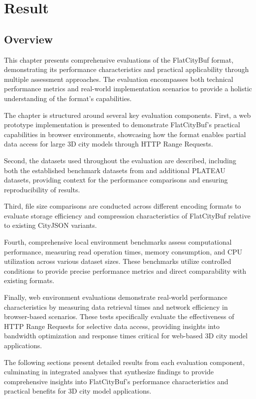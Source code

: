 \chapter{Result}
\label{chp:result}
\section{Overview}
\label{result:overview}
This chapter presents comprehensive evaluations of the FlatCityBuf format, demonstrating its performance characteristics and practical applicability through multiple assessment approaches. The evaluation encompasses both technical performance metrics and real-world implementation scenarios to provide a holistic understanding of the format's capabilities.

The chapter is structured around several key evaluation components. First, a web prototype implementation is presented to demonstrate FlatCityBuf's practical capabilities in browser environments, showcasing how the format enables partial data access for large 3D city models through HTTP Range Requests.

Second, the datasets used throughout the evaluation are described, including both the established benchmark datasets from \citet{ledoux_2024} and additional PLATEAU datasets, providing context for the performance comparisons and ensuring reproducibility of results.

Third, file size comparisons are conducted across different encoding formats to evaluate storage efficiency and compression characteristics of FlatCityBuf relative to existing CityJSON variants.

Fourth, comprehensive local environment benchmarks assess computational performance, measuring read operation times, memory consumption, and CPU utilization across various dataset sizes. These benchmarks utilize controlled conditions to provide precise performance metrics and direct comparability with existing formats.

Finally, web environment evaluations demonstrate real-world performance characteristics by measuring data retrieval times and network efficiency in browser-based scenarios. These tests specifically evaluate the effectiveness of HTTP Range Requests for selective data access, providing insights into bandwidth optimization and response times critical for web-based 3D city model applications.

The following sections present detailed results from each evaluation component, culminating in integrated analyses that synthesize findings to provide comprehensive insights into FlatCityBuf's performance characteristics and practical benefits for 3D city model applications.

